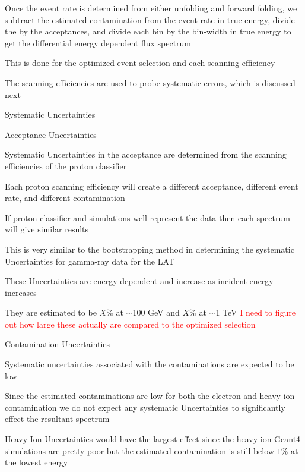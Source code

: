 \documentclass{article}
\begin{document}
\begin{myEnumerate}
\begin{myEnumerate}
\begin{myEnumerate}
			\end{myEnumerate}
			\item Once the event rate is determined from either unfolding and forward folding, we subtract the estimated contamination from the event rate in true energy, divide the by the acceptances, and divide each bin by the bin-width in true energy to get the differential energy dependent flux spectrum
			\item This is done for the optimized event selection and each scanning efficiency
			\item The scanning efficiencies are used to probe systematic errors, which is discussed next
		\end{myEnumerate}
		\item Systematic Uncertainties
		\begin{myEnumerate}
			\item Acceptance Uncertainties
			\begin{myEnumerate}
				\item Systematic Uncertainties in the acceptance are determined from the scanning efficiencies of the proton classifier
				\item Each proton scanning efficiency will create a different acceptance, different event rate, and different contamination
				\item  If proton classifier and simulations well represent the data then each spectrum will give similar results
				\item This is very similar to the bootstrapping method in determining the systematic Uncertainties for gamma-ray data for the LAT
				\item These Uncertainties are energy dependent and increase as incident energy increases
				\item They are estimated to be $X\%$ at $\sim$100 GeV and $X\%$ at $\sim$1 TeV \textcolor{red}{I need to figure out how large these actually are compared to the optimized selection}
			\end{myEnumerate}
			\item Contamination Uncertainties
			\begin{myEnumerate}
				\item Systematic uncertainties associated with the contaminations are expected to be low
				\item Since the estimated contaminations are low for both the electron and heavy ion contamination we do not expect any systematic Uncertainties to significantly effect the resultant spectrum
				\item Heavy Ion Uncertainties would have the largest effect since the heavy ion Geant4 simulations are pretty poor but the estimated contamination is still below $1\%$ at the lowest energy

\end{myEnumerate}
\end{myEnumerate}
\end{myEnumerate}
\end{document}
